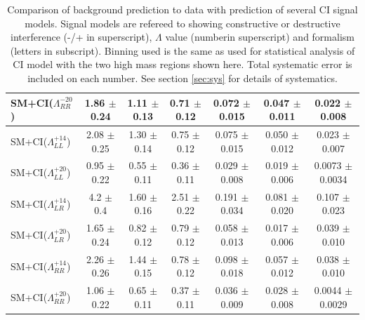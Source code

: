 \begin {table}[h]
\begin{center}
\begin{tabular}{  l | c c c | c c c  }
			SM+CI($\Lambda^{-20}_{RR}$) & 1.86 $\pm$ 0.24 & 1.11 $\pm$ 0.13 & 0.71 $\pm$ 0.12 & 0.072 $\pm$ 0.015 & 0.047 $\pm$ 0.011 & 0.022 $\pm$ 0.008 \\
			\hline
			SM+CI($\Lambda^{+14}_{LL}$) & 2.08 $\pm$ 0.25 & 1.30 $\pm$ 0.14 & 0.75 $\pm$ 0.12 & 0.075 $\pm$ 0.015 & 0.050 $\pm$ 0.012 & 0.023 $\pm$ 0.007 \\
			SM+CI($\Lambda^{+20}_{LL}$) & 0.95 $\pm$ 0.22 & 0.55 $\pm$ 0.11 & 0.36 $\pm$ 0.11 & 0.029 $\pm$ 0.008 & 0.019 $\pm$ 0.006 & 0.0073 $\pm$ 0.0034 \\
			SM+CI($\Lambda^{+14}_{LR}$) & 4.2 $\pm$ 0.4 & 1.60 $\pm$ 0.16 & 2.51 $\pm$ 0.22 & 0.191 $\pm$ 0.034 & 0.081 $\pm$ 0.020 & 0.107 $\pm$ 0.023 \\
			SM+CI($\Lambda^{+20}_{LR}$) & 1.65 $\pm$ 0.24 & 0.82 $\pm$ 0.12 & 0.79 $\pm$ 0.12 & 0.058 $\pm$ 0.013 & 0.017 $\pm$ 0.006 & 0.039 $\pm$ 0.010 \\
			SM+CI($\Lambda^{+14}_{RR}$) & 2.26 $\pm$ 0.26 & 1.44 $\pm$ 0.15 & 0.78 $\pm$ 0.12 & 0.098 $\pm$ 0.018 & 0.057 $\pm$ 0.012 & 0.038 $\pm$ 0.010 \\
			SM+CI($\Lambda^{+20}_{RR}$) & 1.06 $\pm$ 0.22 & 0.65 $\pm$ 0.11 & 0.37 $\pm$ 0.11 & 0.036 $\pm$ 0.009 & 0.028 $\pm$ 0.008 & 0.0044 $\pm$ 0.0029 \\
			\hline
	    	\hline
	  	\end{tabular}
	  	\caption{Comparison of background prediction to data with prediction of several CI signal models. Signal models are refereed to showing constructive or destructive interference (-/+ in superscript), $\Lambda$ value (numberin superscript) and formalism (letters in subscript). Binning used is the same as used for statistical analysis of CI model with the two high mass regions shown here. Total systematic error is included on each number. See section \ref{sec:sys} for details of systematics.}
	  	\label{tab:CI_results3}
	  	\end{center}
	\end {table}






